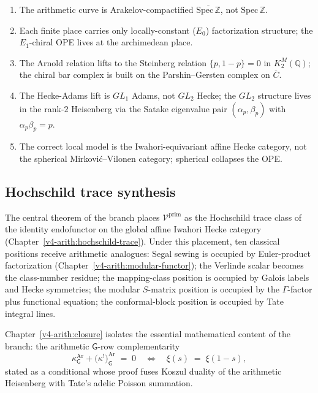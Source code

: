 \begin{enumerate}
\item The arithmetic curve is Arakelov-compactified
\(\overline{\mathrm{Spec}\,\mathbb{Z}}\), not \(\mathrm{Spec}\,\mathbb{Z}\).
\item Each finite place carries only locally-constant (\(E_{0}\))
factorization structure; the \(E_{1}\)-chiral OPE lives at the
archimedean place.
\item The Arnold relation lifts to the Steinberg relation
\(\{p,1-p\}=0\) in \(K_{2}^{M}(\mathbb{Q})\); the chiral bar complex
is built on the Parshin--Gersten complex on \(\overline{C}\).
\item The Hecke-Adams lift is \(GL_{1}\) Adams, not \(GL_{2}\) Hecke;
the \(GL_{2}\) structure lives in the rank-\(2\) Heisenberg via the
Satake eigenvalue pair \((\alpha_{p},\beta_{p})\) with
\(\alpha_{p}\beta_{p}=p\).
\item The correct local model is the Iwahori-equivariant affine
Hecke category, not the spherical Mirkovi\'c--Vilonen category;
spherical collapses the OPE.
\end{enumerate}

\subsection*{Hochschild trace synthesis}

The central theorem of the branch places
\(\mathcal{V}^{\mathrm{prim}}\) as the Hochschild trace class of the
identity endofunctor on the global affine Iwahori Hecke category
(Chapter~\ref{v4-arith:hochschild-trace}). Under this placement,
ten classical positions receive arithmetic analogues: Segal sewing
is occupied by Euler-product factorization (Chapter~\ref{v4-arith:modular-functor});
the Verlinde scalar becomes the class-number residue; the mapping-class
position is occupied by Galois labels and Hecke symmetries; the modular
\(S\)-matrix position is occupied by the \(\Gamma\)-factor plus functional
equation; the conformal-block position is occupied by Tate integral lines.

Chapter~\ref{v4-arith:closure} isolates the
essential mathematical content of the branch: the arithmetic
\(\mathsf{G}\)-row complementarity
\[
\kappa^{\mathrm{Ar}}_{\mathsf{G}}
+\bigl(\kappa^{!}\bigr)^{\mathrm{Ar}}_{\mathsf{G}}
\;=\;0
\quad\Longleftrightarrow\quad
\xi(s)\;=\;\xi(1-s),
\]
stated as a conditional whose proof fuses Koszul duality of
the arithmetic Heisenberg with Tate's adelic Poisson summation.

